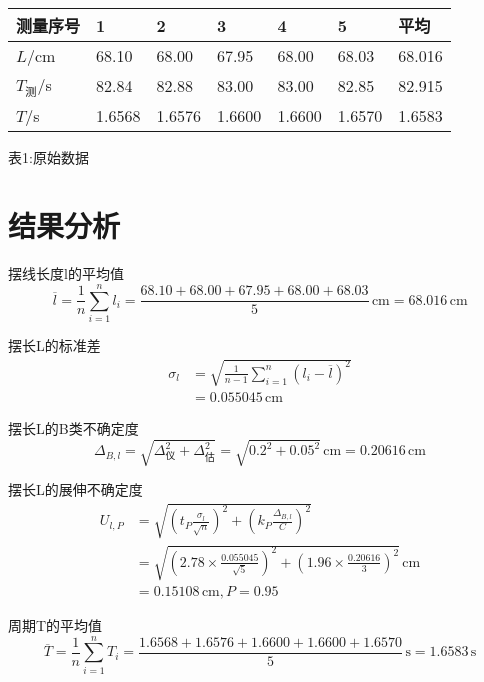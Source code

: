 \documentclass[UTF8]{article}
\newcommand{\sector}[2]{\section*{#1}%
\vspace*{-0.8em}\large{#2}%
\vspace*{-0.3em}
}
\begin{document}
{\begin{center}
    \normalsize{
        \begin{tabularx}{1\textwidth}{|Y|Y|Y|Y|Y|Y|Y|}
            \hline
            测量序号
                &  1&  2&  3&  4&  5&平均\\
            \hline
            $L$/cm
                &   68.10&   68.00&   67.95&   68.00&   68.03&   68.016\\
            \hline
            $T_{\text{测}}$/s
                &   82.84&   82.88&   83.00&   83.00&   82.85&   82.915\\
            \hline
            $T$/s
                &   1.6568&   1.6576&   1.6600&   1.6600&   1.6570&   1.6583\\
            \hline
        \end{tabularx}
        \vspace{0.3em}
    
        表1:原始数据
    }
\end{center}
\vspace{-1em}

}\sector{结果分析}{

摆线长度l的平均值
$$
\overline{l}=\frac{1}{n}\sum_{i=1}^{n}l_i=\frac{68.10+68.00+67.95+68.00+68.03}{5}\,\mathrm{cm}=68.016\,\mathrm{cm}
$$

摆长L的标准差
$$
\begin{aligned}
\sigma_{l}&=\sqrt{\frac{1}{n-1}\sum_{i=1}^n\left(l_i-\overline{l}\right)^2}\\
&=0.055045\,\mathrm{cm}
\end{aligned}
$$

摆长L的B类不确定度
$$
\Delta_{B,l}=\sqrt{\Delta_\text{仪}^2+\Delta_\text{估}^2}=\sqrt{0.2^2+0.05^2}\,\mathrm{cm}=0.20616\,\mathrm{cm}
$$

摆长L的展伸不确定度
$$
\begin{aligned}
U_{l,P}&=\sqrt{\left(t_P\frac{\sigma_{l}}{\sqrt{n}}\right)^2+\left(k_P\frac{\Delta_{B,l}}{C}\right)^2}\\
&=\sqrt{\left(2.78\times\frac{0.055045}{\sqrt{5}}\right)^2+\left(1.96\times\frac{0.20616}{3}\right)^2}\,\mathrm{cm}\\
&=0.15108\,\mathrm{cm},P=0.95
\end{aligned}
$$

周期T的平均值
$$
\overline{T}=\frac{1}{n}\sum_{i=1}^{n}T_i=\frac{1.6568+1.6576+1.6600+1.6600+1.6570}{5}\,\mathrm{s}=1.6583\,\mathrm{s}
$$

}
\end{document}
